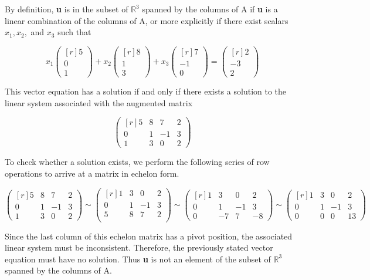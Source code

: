\documentclass[11pt, oneside]{article}   	%
\begin{document}
By definition, \textbf{u} is in the subset of $\mathbb{R}^3$ spanned by the columns of A if \textbf{u} is a linear combination of the columns of A, or more explicitly if there exist scalars $x_1, x_2,$ and $x_3$ such that

\[
x_1
\begin{pmatrix*}[r]
5\\
0\\
1\end{pmatrix*}
+ x_2
\begin{pmatrix*}[r]
8\\
1\\
3\end{pmatrix*}
+x_3
\begin{pmatrix*}[r]
7\\
-1\\
0\end{pmatrix*}
=
\begin{pmatrix*}[r]
2\\
-3\\
2\end{pmatrix*}
\]

This vector equation has a solution if and only if there exists a solution to the linear system associated with the augmented matrix

\[
\begin{pmatrix*}[r]
5&8&7&2\\
0&1&-1&3\\
1&3&0&2\end{pmatrix*}
\]

To check whether a solution exists, we perform the following series of row operations to arrive at a matrix in echelon form.

\[
\begin{pmatrix*}[r]
5&8&7&2\\
0&1&-1&3\\
1&3&0&2\end{pmatrix*}
\sim
\begin{pmatrix*}[r]
1&3&0&2\\
0&1&-1&3\\
5&8&7&2\\
\end{pmatrix*}
\sim
\begin{pmatrix*}[r]
1&3&0&2\\
0&1&-1&3\\
0&-7&7&-8
\end{pmatrix*}
\sim
\begin{pmatrix*}[r]
1&3&0&2\\
0&1&-1&3\\
0&0&0&13
\end{pmatrix*}
\]

Since the last column of this echelon matrix has a pivot position, the associated linear system must be inconsistent. Therefore, the previously stated vector equation must have no solution. Thus \textbf{u} is not an element of the subset of $\mathbb{R}^3$ spanned by the columns of A.
\end{document}
